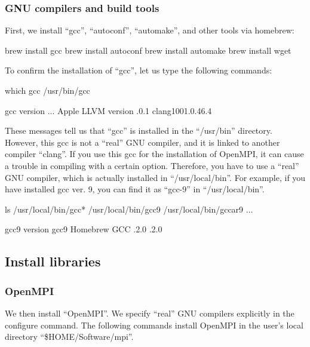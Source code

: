 \documentclass[a4paper,11pt,oneside,english]{sphinxmanual}
\begin{document}
\subsubsection{GNU compilers and build tools}
\label{\detokenize{98_Appendix:id4}}
First, we install “gcc”, “autoconf”, “automake”, and other tools via homebrew:

\begin{sphinxVerbatim}[commandchars=\\\{\}]
\PYGZdl{} brew install gcc
\PYGZdl{} brew install autoconf
\PYGZdl{} brew install automake
\PYGZdl{} brew install wget
\end{sphinxVerbatim}

To confirm the installation of “gcc”, let us type the following commands:

\begin{sphinxVerbatim}[commandchars=\\\{\}]
\PYGZdl{} which gcc
/usr/bin/gcc

\PYGZdl{} gcc \PYGZhy{}\PYGZhy{}version
...
Apple LLVM version .0.1 clang\PYGZhy{}1001.0.46.4
\end{sphinxVerbatim}

These messages tell us that “gcc” is installed in the “/usr/bin” directory.
However, this gcc is not a “real” GNU compiler, and it is linked to another compiler “clang”.
If you use this gcc for the installation of OpenMPI,
it can cause a trouble in compiling  with a certain option.
Therefore, you have to use a “real” GNU compiler, which is actually installed in “/usr/local/bin”.
For example, if you have installed gcc ver. 9, you can find it as “gcc-9” in “/usr/local/bin”.

\begin{sphinxVerbatim}[commandchars=\\\{\}]
\PYGZdl{} ls /usr/local/bin/gcc*
/usr/local/bin/gcc\PYGZhy{}9      /usr/local/bin/gcc\PYGZhy{}ar\PYGZhy{}9      ...

\PYGZdl{} gcc\PYGZhy{}9 \PYGZhy{}\PYGZhy{}version
gcc\PYGZhy{}9 Homebrew GCC .2.0 .2.0
\end{sphinxVerbatim}


\subsection{Install libraries}
\label{\detokenize{98_Appendix:install-libraries}}

\subsubsection{OpenMPI}
\label{\detokenize{98_Appendix:id5}}
We then install “OpenMPI”. We specify “real” GNU compilers explicitly in the configure command.
The following commands install OpenMPI in the user’s local directory “\$HOME/Software/mpi”.
\end{document}
